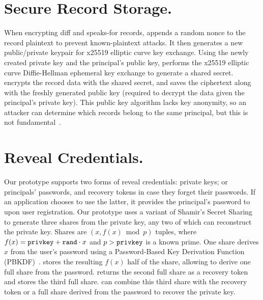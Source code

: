 \section{Secure Record Storage.}
%
When encrypting diff and speaks-for records, \sys appends a random nonce to
the record plaintext to prevent known-plaintext attacks.
%
It then generates a new public/private keypair for x25519 elliptic curve key
exchange.
%
Using the newly created private key and the principal's public key, \sys
performs the x25519 elliptic curve Diffie-Hellman ephemeral key exchange to
generate a shared secret.
%
\sys encrypts the record data with the shared secret, and saves the
ciphertext along with the freshly generated public key (required to decrypt
the data given the principal's private key).
%
This public key algorithm lacks key anonymity, so an attacker can determine
which records belong to the same principal, but this is not
fundamental~\cite{anonymous-keys}.

%

\section{Reveal Credentials.}
%
Our prototype supports two forms of reveal credentials: \one{} private keys; or
\two{} principals' passwords, and recovery
tokens in case they forget their passwords.
%
If an application chooses to use the latter, it provides the principal's password
to \sys upon user registration.
%
Our prototype uses a variant of Shamir's Secret Sharing~\cite{secretsharing}
to generate three shares from the private key, any two of which can reconstruct the
private key.
%
Shares are $(x, f(x) \bmod p)$ tuples, where $f(x) = \texttt{{privkey}} + \texttt{{rand}} \cdot
x$ and $p > \texttt{{privkey}}$ is a known prime.
%
One share derives $x$ from the user's password using a Password-Based Key
Derivation Function (PBKDF)~\cite{pbkdf-rfc}.
%
\sys stores the resulting $f(x)$ half of the share, allowing \sys to derive one
full share from the password.
%
%
\sys returns the second full share as a recovery token and stores the third full
share.
%
\sys can combine this third share with the recovery token
or a full share derived from the password to recover the
private key.
%

